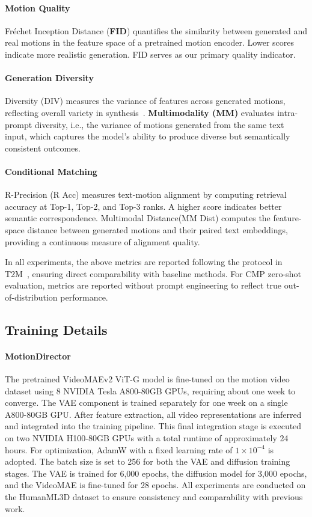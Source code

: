 \documentclass[a4paper,12pt]{article}
\begin{document}
\paragraph{Motion Quality}
Fréchet Inception Distance (\textbf{FID}) quantifies the similarity between generated and real motions in the feature space of a pretrained motion encoder. Lower scores indicate more realistic generation. FID serves as our primary quality indicator.

\paragraph{Generation Diversity}
Diversity (DIV) measures the variance of features across generated motions, reflecting overall variety in synthesis~\cite{guo2022generating}. \textbf{Multimodality (MM)} evaluates intra-prompt diversity, i.e., the variance of motions generated from the same text input, which captures the model’s ability to produce diverse but semantically consistent outcomes.

\paragraph{Conditional Matching}
R-Precision (R Acc) measures text-motion alignment by computing retrieval accuracy at Top-1, Top-2, and Top-3 ranks. A higher score indicates better semantic correspondence. Multimodal Distance(MM Dist) computes the feature-space distance between generated motions and their paired text embeddings, providing a continuous measure of alignment quality.

\noindent In all experiments, the above metrics are reported following the protocol in T2M~\cite{guo2022generating}, ensuring direct comparability with baseline methods. For CMP zero-shot evaluation, metrics are reported without prompt engineering to reflect true out-of-distribution performance.



\subsection{Training Details}

\paragraph{MotionDirector}
The pretrained VideoMAEv2 ViT-G model is fine-tuned on the motion video dataset using 8 NVIDIA Tesla A800-80GB GPUs, requiring about one week to converge. The VAE component is trained separately for one week on a single A800-80GB GPU. After feature extraction, all video representations are inferred and integrated into the training pipeline. This final integration stage is executed on two NVIDIA H100-80GB GPUs with a total runtime of approximately 24 hours. For optimization, AdamW with a fixed learning rate of $1\times10^{-4}$ is adopted. The batch size is set to 256 for both the VAE and diffusion training stages. The VAE is trained for 6,000 epochs, the diffusion model for 3,000 epochs, and the VideoMAE is fine-tuned for 28 epochs. All experiments are conducted on the HumanML3D dataset to ensure consistency and comparability with previous work.
\end{document}
